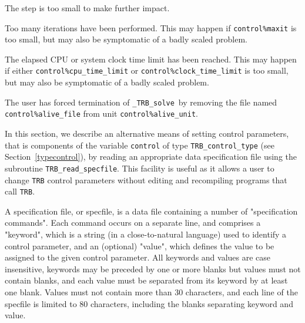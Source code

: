 \documentclass{galahad}
\newcommand{\packagename}{TRB}
\newcommand{\fullpackagename}{\libraryname\_\packagename}
\newcommand{\solver}{{\tt \fullpackagename\_solve}}
\begin{document}
\begin{description}
 The step is too small to make further impact.

 Too many iterations have been performed.
  This may happen if
    {\tt control\%maxit} is too small, but may also be symptomatic of
    a badly scaled problem.

 The elapsed CPU or system clock time limit has been
    reached. This may happen if either {\tt control\%cpu\_time\_limit} or
    {\tt control\%clock\_time\_limit} is too small, but may also be symptomatic
    of a badly scaled problem.

 The user has forced termination of \solver\
     by removing the file named {\tt control\%a\-live\_file} from
     unit {\tt control\%alive\_unit}.

\end{description}


\galfeatures
\noindent In this section, we describe an alternative means of setting
control parameters, that is components of the variable {\tt control} of type
{\tt \packagename\_control\_type}
(see Section~\ref{typecontrol}),
by reading an appropriate data specification file using the
subroutine {\tt \packagename\_read\_specfile}. This facility
is useful as it allows a user to change  {\tt \packagename} control parameters
without editing and recompiling programs that call {\tt \packagename}.

A specification file, or specfile, is a data file containing a number of
"specification commands". Each command occurs on a separate line,
and comprises a "keyword",
which is a string (in a close-to-natural language) used to identify a
control parameter, and
an (optional) "value", which defines the value to be assigned to the given
control parameter. All keywords and values are case insensitive,
keywords may be preceded by one or more blanks but
values must not contain blanks, and
each value must be separated from its keyword by at least one blank.
Values must not contain more than 30 characters, and
each line of the specfile is limited to 80 characters,
including the blanks separating keyword and value.
\end{document}

